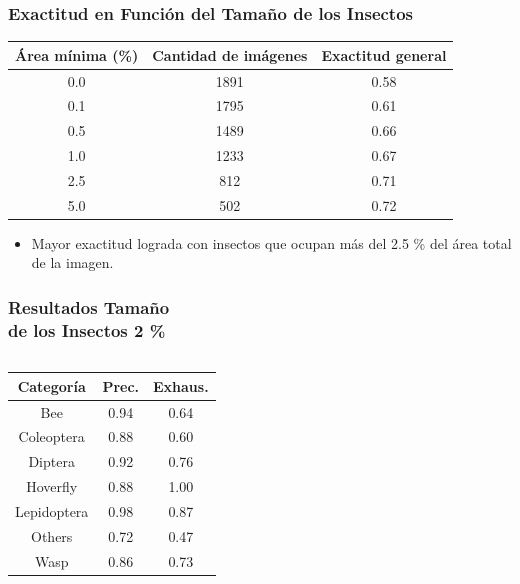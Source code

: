\begin{frame}
    \frametitle{Exactitud en Función del Tamaño de los Insectos}

    \begin{center}\small
    \begin{tabular}{ccc}
        \toprule
        \textbf{Área mínima (\%)} & \textbf{Cantidad de imágenes} & \textbf{Exactitud general}\\
        \midrule
        0.0 & 1891 & 0.58 \\
        0.1 & 1795 & 0.61 \\
        0.5 & 1489 & 0.66 \\
        1.0 & 1233 & 0.67 \\
        2.5 & 812 & 0.71 \\
        5.0 & 502 & 0.72 \\
        \bottomrule
    \end{tabular}
    \end{center}

    \begin{itemize}
        \item Mayor exactitud lograda con insectos que ocupan más del 2.5 \% del área total de la imagen.
    \end{itemize}
\end{frame}

\begin{frame}
    \frametitle{Resultados Tamaño\\ de los Insectos 2 \%}
    \vspace*{-0.5cm}
    \begin{columns}
    \begin{center}\small
    \begin{tabular}{@{}ccc@{}}
    \toprule
          \textbf{Categoría} & \textbf{Prec.}  &  \textbf{Exhaus.}\\ 
    \midrule
        Bee &  0.94 &  0.64 \\
        Coleoptera &  0.88 &  0.60 \\
        Diptera &  0.92 &  0.76 \\
        Hoverfly &  0.88 &  1.00 \\
        Lepidoptera &  0.98 &  0.87 \\
        Others &  0.72 &  0.47 \\
        Wasp &  0.86 &  0.73 \\
    \bottomrule
    \end{tabular}
    \end{center}
    \vspace*{-1cm}
    \begin{center}
    \end{center}
    \end{columns}
\end{frame}



